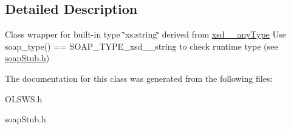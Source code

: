\subsection{Detailed Description}
Class wrapper for built-\/in type \char`\"{}xs:string\char`\"{} derived from \hyperlink{classxsd____anyType}{xsd\_\-\_\-anyType} Use soap\_\-type() == SOAP\_\-TYPE\_\-xsd\_\-\_\-string to check runtime type (see \hyperlink{soapStub_8h_source}{soapStub.h}) 

The documentation for this class was generated from the following files:\begin{DoxyCompactItemize}
\item 
OLSWS.h\item 
soapStub.h\end{DoxyCompactItemize}
